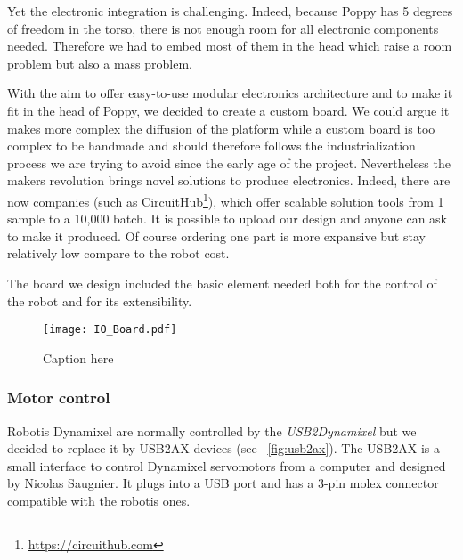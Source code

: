 Yet the electronic integration is challenging. Indeed, because Poppy has 5 degrees of freedom in the torso, there is not enough room for all electronic components needed. Therefore we had to embed most of them in the head which raise a room problem but also a mass problem.

With the aim to offer easy-to-use modular electronics architecture and to make it fit in the head of Poppy, we decided to create a custom board. We could argue it makes more complex the diffusion of the platform while a custom board is too complex to be handmade and should therefore follows the industrialization process we are trying to avoid since the early age of the project. Nevertheless the makers revolution brings novel solutions to produce electronics. Indeed, there are now companies (such as CircuitHub\footnote{\url{https://circuithub.com}}), which offer scalable solution tools from 1 sample to a 10,000 batch. It is possible to upload our design and anyone can ask to make it produced. Of course ordering one part is more expansive but stay relatively low compare to the robot cost.

The board we design included the basic element needed both for the control of the robot and for its extensibility.


\begin{figure}[tb]
    \begin{center}
        \texttt{[image: IO\_Board.pdf]}
    \end{center}
    \caption{Caption here}
    \label{fig:figure1}
\end{figure}


\subsubsection{Motor control} %
Robotis Dynamixel are normally controlled by the \emph{USB2Dynamixel} but we decided to replace it by USB2AX devices (see \figurename~\ref{fig:usb2ax}). The USB2AX is a small interface to control Dynamixel servomotors from a computer and designed by Nicolas Saugnier. It plugs into a USB port and has a 3-pin molex connector compatible with the robotis ones.

